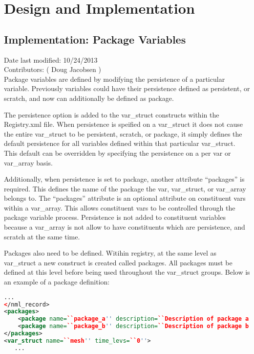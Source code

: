 \documentclass[11pt]{report}
\begin{document}

\chapter{Design and Implementation}
\section{Implementation: Package Variables}
Date last modified: 10/24/2013 \\
Contributors: ( Doug Jacobsen ) \\

Package variables are defined by modifying the persistence of a particular
variable. Previously variables could have their persistence defined as
persistent, or scratch, and now can additionally be defined as package.

The persistence option is added to the var\_struct constructs within the Registry.xml file. When persistence is
speified on a var\_struct it does not cause the entire var\_struct to be
persistent, scratch, or package, it simply defines the default persistence for
all variables defined within that particular var\_struct. This default can be
overridden by specifying the persistence on a per var or var\_array basis.

Additionally, when persistence is set to package, another attribute
``packages'' is required. This defines the name of the package the var,
var\_struct, or var\_array belongs to. The ``packages'' attribute is an
optional attribute on constituent vars within a var\_array. This allows
constituent vars to be controlled through the package variable process.
Persistence is not added to constituent variables because a var\_array is not
allow to have constituents which are persistence, and scratch at the same time.

Packages also need to be defined. Witihin registry, at the same level as
var\_struct a new construct is created called packages. All packages must be
defined at this level before being used throughout the var\_struct groups.
Below is an example of a package definition:

{\scriptsize
\begin{lstlisting}[language=XML]
   ...
</nml_record>
<packages>
	<package name=``package_a'' description=``Description of package a''/>
	<package name=``package_b'' description=``Description of package b''/>
</packages>
<var_struct name=``mesh'' time_levs=``0''>
   ...
\end{lstlisting}
}
\end{document}
